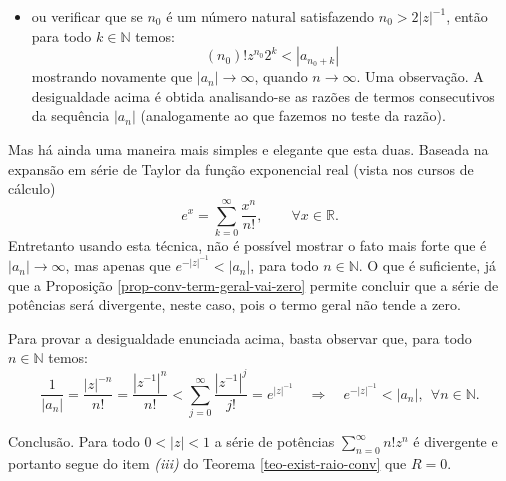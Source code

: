 \begin{exemplo}
\begin{itemize}
	\item ou verificar que se $n_0$ é um número natural satisfazendo $n_0>2|z|^{-1}$,
	então para todo $k\in\mathbb{N}$ temos:
	\[
	(n_0)!z^{n_0}2^{k}< |a_{n_0+k}| 
	\]
	mostrando novamente que $|a_n|\to\infty$, quando $n\to\infty$.
	Uma observação. A desigualdade acima é obtida analisando-se as razões de termos
	consecutivos da sequência $|a_n|$ (analogamente ao que fazemos no teste da razão). 
\end{itemize}

Mas há ainda uma maneira mais simples e elegante que esta duas. Baseada
na expansão em série de Taylor da função exponencial real (vista nos cursos de cálculo)
\[
e^{x} = \sum_{k=0}^{\infty}\frac{x^n}{n!}, \qquad \forall x\in\mathbb{R}.
\]
Entretanto usando esta técnica, não é possível mostrar 
o fato mais forte que é $|a_n|\to\infty$,
mas apenas que $e^{-|z|^{-1}}<|a_n|$, para todo $n\in\mathbb{N}$. O que é suficiente, 
já que a Proposição \ref{prop-conv-term-geral-vai-zero} permite concluir que a série
de potências será divergente, neste caso, pois o termo geral não tende a zero. 

Para provar a desigualdade enunciada acima, basta observar que, para todo $n\in\mathbb{N}$
temos:
\[
\frac{1}{|a_n|} 
= 
\frac{|z|^{-n}}{n!}
=
\frac{|z^{-1}|^{n}}{n!}
< 
\sum_{j=0}^{\infty}\frac{|z^{-1}|^{j}}{j!}=e^{|z|^{-1}}
\quad \Longrightarrow\quad
e^{-|z|^{-1}}<|a_n|, \ \ \forall n\in\mathbb{N}.
\]


Conclusão. Para todo $0<|z|<1$ a série de potências $\sum_{n=0}^{\infty}n!z^n$
é divergente e portanto segue do item \textit{(iii)} 
do Teorema \ref{teo-exist-raio-conv} que $R=0$.
\end{exemplo}



